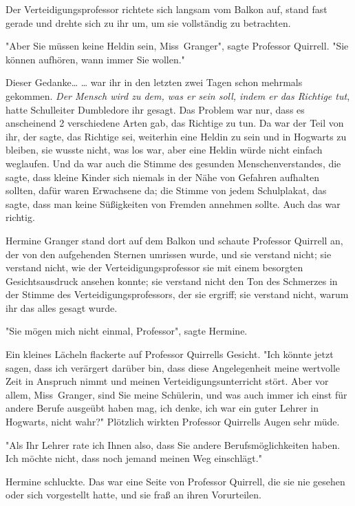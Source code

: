 {Der Verteidigungsprofessor richtete sich langsam vom Balkon auf, stand fast gerade und drehte sich zu ihr um, um sie vollständig zu betrachten.

"Aber Sie müssen keine Heldin sein, Miss~Granger", sagte Professor Quirrell. "Sie können aufhören, wann immer Sie wollen."

Dieser Gedanke… … war ihr in den letzten zwei Tagen schon mehrmals gekommen. \emph{Der Mensch wird zu dem, was er sein soll, indem er das Richtige tut}, hatte Schulleiter Dumbledore ihr gesagt. Das Problem war nur, dass es anscheinend 2 verschiedene Arten gab, das Richtige zu tun. Da war der Teil von ihr, der sagte, das Richtige sei, weiterhin eine Heldin zu sein und in Hogwarts zu bleiben, sie wusste nicht, was los war, aber eine Heldin würde nicht einfach weglaufen. Und da war auch die Stimme des gesunden Menschenverstandes, die sagte, dass kleine Kinder sich niemals in der Nähe von Gefahren aufhalten sollten, dafür waren Erwachsene da; die Stimme von jedem Schulplakat, das sagte, dass man keine Süßigkeiten von Fremden annehmen sollte. Auch das war richtig.

Hermine Granger stand dort auf dem Balkon und schaute Professor Quirrell an, der von den aufgehenden Sternen umrissen wurde, und sie verstand nicht; sie verstand nicht, wie der Verteidigungsprofessor sie mit einem besorgten Gesichtsausdruck ansehen konnte; sie verstand nicht den Ton des Schmerzes in der Stimme des Verteidigungsprofessors, der sie ergriff; sie verstand nicht, warum ihr das alles gesagt wurde.

"Sie mögen mich nicht einmal, Professor", sagte Hermine.

Ein kleines Lächeln flackerte auf Professor Quirrells Gesicht. "Ich könnte jetzt sagen, dass ich verärgert darüber bin, dass diese Angelegenheit meine wertvolle Zeit in Anspruch nimmt und meinen Verteidigungsunterricht stört. Aber vor allem, Miss~Granger, sind Sie meine Schülerin, und was auch immer ich einst für andere Berufe ausgeübt haben mag, ich denke, ich war ein guter Lehrer in Hogwarts, nicht wahr?" Plötzlich wirkten Professor Quirrells Augen sehr müde.

"Als Ihr Lehrer rate ich Ihnen also, dass Sie andere Berufsmöglichkeiten haben. Ich möchte nicht, dass noch jemand meinen Weg einschlägt."

Hermine schluckte. Das war eine Seite von Professor Quirrell, die sie nie gesehen oder sich vorgestellt hatte, und sie fraß an ihren Vorurteilen.

}

